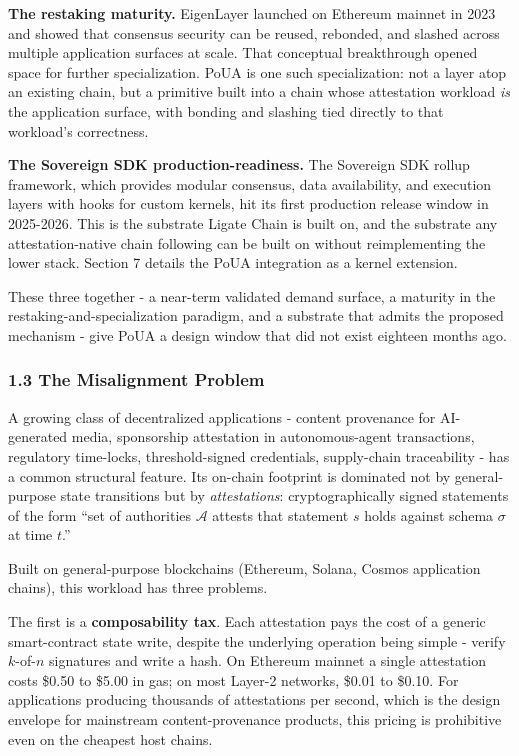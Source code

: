 \documentclass[
  11pt,
]{article}
\begin{document}
\textbf{The restaking maturity.} EigenLayer launched on Ethereum mainnet
in 2023 and showed that consensus security can be reused, rebonded, and
slashed across multiple application surfaces at scale. That conceptual
breakthrough opened space for further specialization. PoUA is one such
specialization: not a layer atop an existing chain, but a primitive
built into a chain whose attestation workload \emph{is} the application
surface, with bonding and slashing tied directly to that workload's
correctness.

\textbf{The Sovereign SDK production-readiness.} The Sovereign SDK
rollup framework, which provides modular consensus, data availability,
and execution layers with hooks for custom kernels, hit its first
production release window in 2025-2026. This is the substrate Ligate
Chain is built on, and the substrate any attestation-native chain
following can be built on without reimplementing the lower stack.
Section 7 details the PoUA integration as a kernel extension.

These three together - a near-term validated demand surface, a maturity
in the restaking-and-specialization paradigm, and a substrate that
admits the proposed mechanism - give PoUA a design window that did not
exist eighteen months ago.

\subsubsection{1.3 The Misalignment
Problem}\label{the-misalignment-problem}

A growing class of decentralized applications - content provenance for
AI-generated media, sponsorship attestation in autonomous-agent
transactions, regulatory time-locks, threshold-signed credentials,
supply-chain traceability - has a common structural feature. Its
on-chain footprint is dominated not by general-purpose state transitions
but by \emph{attestations}: cryptographically signed statements of the
form ``set of authorities \(\mathcal{A}\) attests that statement \(s\)
holds against schema \(\sigma\) at time \(t\).''

Built on general-purpose blockchains (Ethereum, Solana, Cosmos
application chains), this workload has three problems.

The first is a \textbf{composability tax}. Each attestation pays the
cost of a generic smart-contract state write, despite the underlying
operation being simple - verify \(k\)-of-\(n\) signatures and write a
hash. On Ethereum mainnet a single attestation costs \$0.50 to \$5.00 in
gas; on most Layer-2 networks, \$0.01 to \$0.10. For applications
producing thousands of attestations per second, which is the design
envelope for mainstream content-provenance products, this pricing is
prohibitive even on the cheapest host chains.
\end{document}
